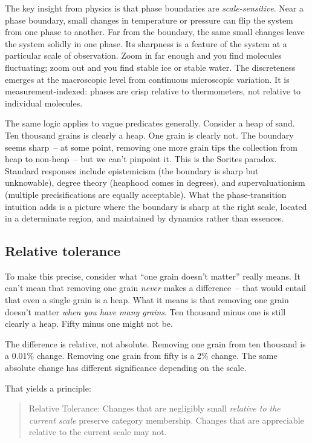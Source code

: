 The key insight from physics is that phase boundaries are \emph{scale-sensitive}. Near a phase boundary, small changes in temperature or pressure can flip the system from one phase to another. Far from the boundary, the same small changes leave the system solidly in one phase. Its sharpness is a feature of the system at a particular scale of observation. Zoom in far enough and you find molecules fluctuating; zoom out and you find stable ice or stable water. The discreteness emerges at the macroscopic level from continuous microscopic variation. It is measurement-indexed: phases are crisp relative to thermometers, not relative to individual molecules.

The same logic applies to vague predicates generally. Consider a heap of sand. Ten thousand grains is clearly a heap. One grain is clearly not. The boundary seems sharp~-- at some point, removing one more grain tips the collection from heap to non-heap~-- but we can't pinpoint it. This is the Sorites paradox. Standard responses include epistemicism (the boundary is sharp but unknowable), degree theory (heaphood comes in degrees), and supervaluationism (multiple precisifications are equally acceptable). What the phase-transition intuition adds is a picture where the boundary is sharp at the right scale, located in a determinate region, and maintained by dynamics rather than essences.

\subsection{Relative tolerance}
\label{subsec:5:relative-tolerance}

To make this precise, consider what \enquote{one grain doesn't matter} really means. It can't mean that removing one grain \emph{never} makes a difference~-- that would entail that even a single grain is a heap. What it means is that removing one grain doesn't matter \emph{when you have many grains}. Ten thousand minus one is still clearly a heap. Fifty minus one might not be.

The difference is relative, not absolute. Removing one grain from ten thousand is a 0.01\% change. Removing one grain from fifty is a 2\% change. The same absolute change has different significance depending on the scale.

That yields a principle:

\begin{quote}
Relative Tolerance: Changes that are negligibly small \emph{relative to the current scale} preserve category membership. Changes that are appreciable relative to the current scale may not.
\end{quote}

